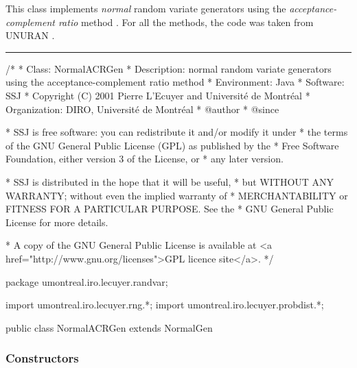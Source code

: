 
This class implements {\em normal\/} random variate generators using
the {\em acceptance-complement ratio\/} method \cite{rHOR90a}. 
For all the methods, the code was taken from UNURAN \cite{iLEY02a}.


\bigskip\hrule

\begin{code}
\begin{hide}
/*
 * Class:        NormalACRGen
 * Description:  normal random variate generators using the
                 acceptance-complement ratio method
 * Environment:  Java
 * Software:     SSJ 
 * Copyright (C) 2001  Pierre L'Ecuyer and Université de Montréal
 * Organization: DIRO, Université de Montréal
 * @author       
 * @since

 * SSJ is free software: you can redistribute it and/or modify it under
 * the terms of the GNU General Public License (GPL) as published by the
 * Free Software Foundation, either version 3 of the License, or
 * any later version.

 * SSJ is distributed in the hope that it will be useful,
 * but WITHOUT ANY WARRANTY; without even the implied warranty of
 * MERCHANTABILITY or FITNESS FOR A PARTICULAR PURPOSE.  See the
 * GNU General Public License for more details.

 * A copy of the GNU General Public License is available at
   <a href="http://www.gnu.org/licenses">GPL licence site</a>.
 */
\end{hide}
package umontreal.iro.lecuyer.randvar;\begin{hide}
import umontreal.iro.lecuyer.rng.*;
import umontreal.iro.lecuyer.probdist.*;
\end{hide}

public class NormalACRGen extends NormalGen \begin{hide} {

\end{hide}\end{code}

\subsubsection* {Constructors}

